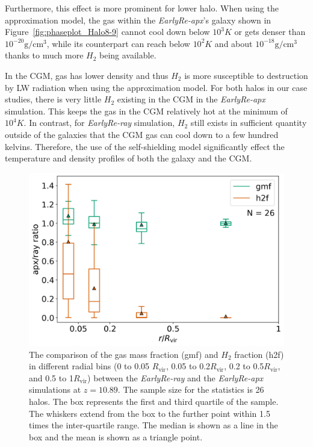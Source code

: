 \documentclass[linenumbers, twocolumn]{aastex631}
\begin{document}
Furthermore, this effect is more prominent for lower halo. When using the approximation model, the gas within the \textit{EarlyRe-apx}'s galaxy shown in Figure~\ref{fig:phaseplot_Halo8-9} cannot cool down below $10^{3} K$ or gets denser than $10^{-20} \mathrm{g}/\mathrm{cm}^{3}$, while its counterpart can reach below $10^{2} K$ and about $10^{-18} \mathrm{g}/\mathrm{cm}^{3}$ thanks to much more $H_{2}$ being available. 

In the CGM, gas has lower density and thus $H_{2}$ is more susceptible to destruction by LW radiation when using the approximation model. For both halos in our case studies, there is very little $H_{2}$ existing in the CGM in the \textit{EarlyRe-apx} simulation. This keeps the gas in the CGM relatively hot at the minimum of $10^{4} K$. In contrast, for \textit{EarlyRe-ray} simulation, $H_{2}$ still exists in sufficient quantity outside of the galaxies that the CGM gas can cool down to a few hundred kelvins. Therefore, the use of the self-shielding model significantly effect the temperature and density profiles of both the galaxy and the CGM.  


\begin{figure}
	\centering
	\includegraphics[width=0.95\columnwidth]{EarlyRe/gmf_h2f_radialprofile_comparison.png}
	\caption{The comparison of the gas mass fraction (gmf) and $H_{2}$ fraction (h2f) in different radial bins (0 to 0.05 $R_\mathrm{vir}$, 0.05 to 0.2$R_\mathrm{vir}$, 0.2 to 0.5$R_\mathrm{vir}$, and 0.5 to 1$R_\mathrm{vir}$) between the \textit{EarlyRe-ray} and the \textit{EarlyRe-apx} simulations at $z = 10.89$. The sample size for the statistics is 26 halos. The box represents the first and third quartile of the sample. The whiskers extend from the box to the further point within 1.5 times the inter-quartile range. The median is shown as a line in the box and the mean is shown as a triangle point.}
	\label{fig:gmf_h2f_radialprofile}
\end{figure}
\end{document}
